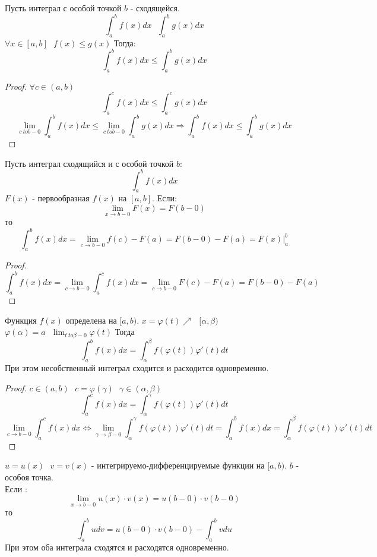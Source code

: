 \begin{theorem}[2]
  Пусть интеграл с особой точкой $b$ - сходящейся.
  \[
    \int^{b}_{a} f(x)dx ~~~ \int^{b}_{a} g(x)dx
  \]
  $\forall x \in [a, b] ~~~ f(x) \le g(x)$ Тогда:
  \[
    \int^{b}_{a} f(x)dx \le \int^{b}_{a} g(x)dx
  \]
\end{theorem}

\begin{proof}
  $\forall c \in (a, b)$
  \[
    \int^{c}_{a} f(x)dx \le \int^{c}_{a} g(x)dx
  \]
  \[
    \lim_{c \ to b - 0} \int^{b}_{a} f(x)dx \le \lim_{c \ to b - 0}
    \int^{b}_{a} g(x)dx \Rightarrow \int^{b}_{a} f(x)dx \le \int^{b}_{a} g(x)dx
  \]
\end{proof}

\begin{theorem}[3]
  Пусть интеграл сходящийся и с особой точкой $b$:
  \[
    \int^{b}_{a} f(x)dx
  \]
  $F(x)$ - первообразная $f(x)$ на $[a, b]$. Если:
  \[
    \lim_{x \to  b - 0} F(x) = F(b - 0)
  \]
  то
  \[
    \int^{b}_{a} f(x)dx = \lim_{c \to b - 0} f(c) - F(a) = F(b - 0) - F(a) =
    F(x)|^{b}_{a}
  \]
\end{theorem}

\begin{proof}
  \[
    \int^{b}_{a} f(x)dx = \lim_{c \to b - 0} \int^{c}_{a} f(x)dx =
    \lim_{c \to b - 0} F(c) - F(a) = F(b - 0) - F(a)
  \]
\end{proof}

\begin{theorem}[4]
  Функция $f(x)$ определена на $[a, b)$. $x = \varphi(t) \nearrow ~~~
  [\alpha, \beta)$\\
  $\varphi(\alpha) = a ~~~ \lim_{t \ to \beta - 0} \varphi(t)$ Тогда
  \[
    \int^{b}_{a} f(x)dx = \int^{\beta}_{\alpha} f(\varphi(t)) \varphi'(t)dt
  \]
  При этом несобственный интеграл сходится и расходится одновременно.
\end{theorem}

\begin{proof}
  $c \in (a, b) ~~~ c = \varphi(\gamma) ~~~ \gamma \in (\alpha, \beta)$
  \[
    \int^{c}_{a} f(x)dx = \int^{\gamma}_{\alpha} f(\varphi(t)) \varphi'(t)dt
  \]
  \[
    \lim_{c \to b - 0} \int^{c}_{a} f(x)dx \Leftrightarrow
    \lim_{\gamma \to \beta - 0} \int^{\gamma}_{\alpha} f(\varphi(t))
    \varphi'(t)dt = \int^{b}_{a} f(x)dx = \int^{\beta}_{\alpha} f(\varphi(t))
    \varphi'(t)dt
  \]
\end{proof}

\begin{theorem}[5]
  $u = u(x) ~~~ v = v(x)$ - интегрируемо-дифференцируемые функции на $[a, b)$.
  $b$ - особоя точка.\\
  Если :
  \[
    \lim_{x \to b - 0} u(x) \cdot v(x) = u(b - 0) \cdot v(b - 0)
  \]
  то
  \[
    \int^{b}_{a} udv = u(b - 0) \cdot v(b - 0) - \int^{b}_{a} vdu
  \]
  При этом оба интеграла сходятся и расходятся одновременно.
\end{theorem}

